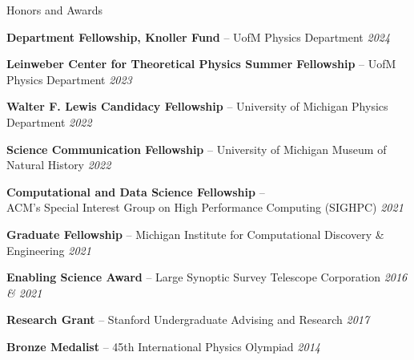 \documentclass{resume} %
\begin{document}
\begin{rSection}{Honors and Awards} \itemsep -3pt \vspace*{-.25cm}

\item \textbf{Department Fellowship, Knoller Fund} -- UofM Physics Department \hfill{\em 2024}

\item \textbf{Leinweber Center for Theoretical Physics Summer Fellowship} -- UofM Physics Department \hfill{\em 2023}

\item \textbf{Walter F. Lewis Candidacy Fellowship} -- University of Michigan Physics Department \hfill{\em 2022}

\item \textbf{Science Communication Fellowship} -- University of Michigan Museum of Natural History \hfill{\em 2022}

\item \textbf{Computational and Data Science Fellowship} -- \\ ACM’s Special Interest Group on High Performance Computing (SIGHPC) \hfill {\em 2021}

\item \textbf{Graduate Fellowship} -- Michigan Institute for Computational Discovery \& Engineering  \hfill {\em 2021}

\item \textbf{Enabling Science Award} -- Large Synoptic Survey Telescope Corporation \hfill {\em 2016 \& 2021}

\item \textbf{Research Grant} -- Stanford Undergraduate Advising and Research \hfill {\em 2017}

\item \textbf{Bronze Medalist} -- 45th International Physics Olympiad \hfill {\em 2014}
\end{rSection}
\end{document}
